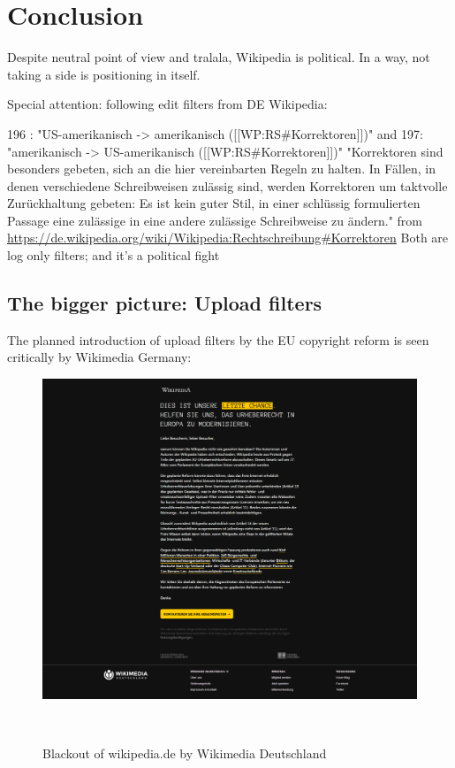 %
\chapter{Conclusion}
\label{chap:conclusion}

Despite neutral point of view and tralala, Wikipedia is political.
In a way, not taking a side is positioning in itself.

Special attention: following edit filters from DE Wikipedia:

196 : "US-amerikanisch -> amerikanisch ([[WP:RS\#Korrektoren]])"
and 197: "amerikanisch -> US-amerikanisch ([[WP:RS\#Korrektoren]])"
"Korrektoren sind besonders gebeten, sich an die hier vereinbarten Regeln zu halten. In Fällen, in denen verschiedene Schreibweisen zulässig sind, werden Korrektoren um taktvolle Zurückhaltung gebeten: Es ist kein guter Stil, in einer schlüssig formulierten Passage eine zulässige in eine andere zulässige Schreibweise zu ändern." from \url{https://de.wikipedia.org/wiki/Wikipedia:Rechtschreibung#Korrektoren}
Both are log only filters;
and it's a political fight

\section{The bigger picture: Upload filters}

The planned introduction of upload filters by the EU copyright reform is seen critically by Wikimedia Germany:
\begin{figure}
\centering
  \includegraphics[width=0.9\columnwidth]{pics/Blackout_of_wikipediade_by_Wikimedia_Deutschland_-_March_2019.png}
  \caption{Blackout of wikipedia.de by Wikimedia Deutschland}~\label{fig:blackout-upload-filters}
\end{figure}

